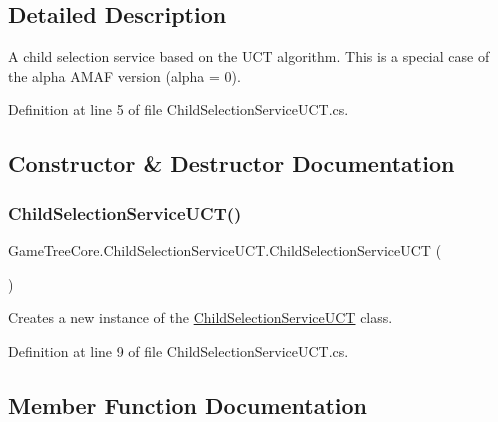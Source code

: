 \subsection{Detailed Description}
A child selection service based on the U\+CT algorithm. This is a special case of the alpha A\+M\+AF version (alpha = 0). 



Definition at line 5 of file Child\+Selection\+Service\+U\+C\+T.\+cs.



\subsection{Constructor \& Destructor Documentation}
\mbox{\label{class_game_tree_core_1_1_child_selection_service_u_c_t_ad649e695f196bc3e4c3899aa591a9aee}} 
\subsubsection{\texorpdfstring{Child\+Selection\+Service\+U\+C\+T()}{ChildSelectionServiceUCT()}}
{\footnotesize\ttfamily Game\+Tree\+Core.\+Child\+Selection\+Service\+U\+C\+T.\+Child\+Selection\+Service\+U\+CT (\begin{DoxyParamCaption}{ }\end{DoxyParamCaption})}



Creates a new instance of the \mbox{\hyperlink{class_game_tree_core_1_1_child_selection_service_u_c_t}{Child\+Selection\+Service\+U\+CT}} class. 



Definition at line 9 of file Child\+Selection\+Service\+U\+C\+T.\+cs.



\subsection{Member Function Documentation}
\mbox{\label{class_game_tree_core_1_1_child_selection_service_u_c_t_abbd068c35c9e9b2fd596b80a16c660fa}} 
